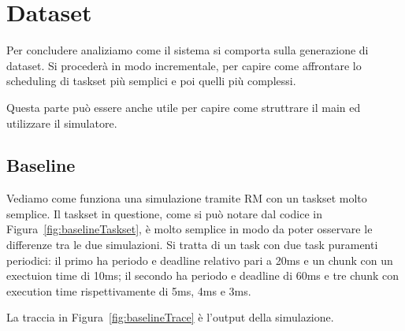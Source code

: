 \chapter{Dataset}
\label{cap:dataset}
Per concludere analiziamo come il sistema si comporta sulla generazione di dataset. Si procederà in modo incrementale, per capire come affrontare lo scheduling di taskset più semplici e poi quelli più complessi.

Questa parte può essere anche utile per capire come struttrare il main ed utilizzare il simulatore.

\section{Baseline}
Vediamo come funziona una simulazione tramite RM con un taskset molto semplice. Il taskset in questione, come si può notare dal codice in Figura~\ref{fig:baselineTaskset}, è molto semplice in modo da poter osservare le differenze tra le due simulazioni. Si tratta di un task con due task puramenti periodici: il primo ha periodo e deadline relativo pari a 20ms e un chunk con un exectuion time di 10ms; il secondo ha periodo e deadline di 60ms e tre chunk con execution time rispettivamente di 5ms, 4ms e 3ms.

La traccia in Figura~\ref{fig:baselineTrace} è l'output della simulazione.

